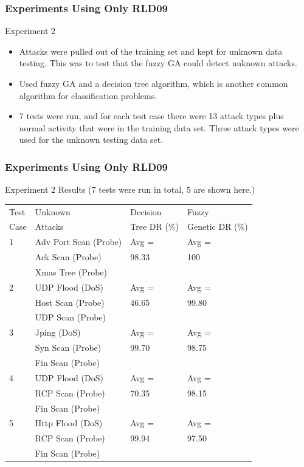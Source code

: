 \documentclass{beamer}
\begin{document}
\begin{frame}
	\frametitle{Experiments Using Only RLD09}
Experiment 2
	\begin{itemize}
		\item Attacks were pulled out of the training set and kept for unknown data testing. This was to test that the fuzzy GA could detect unknown attacks.
		\item Used fuzzy GA and a decision tree algorithm, which is another common algorithm for classification problems.
		\item 7 tests were run, and for each test case there were 13 attack types plus normal activity that were in the training data set. Three attack types were used for the unknown testing data set.
	\end{itemize}
\end{frame}


\begin{frame}
	\frametitle{Experiments Using Only RLD09}
	Experiment 2 Results (7 tests were run in total, 5 are shown here.)
	
\begin{table}
\begin{footnotesize}
\begin{tabular}{llll}
Test & Unknown & Decision & Fuzzy\\
Case & Attacks & Tree DR (\%) & Genetic DR (\%)\\ \hline

1 & Adv Port Scan (Probe) & Avg = & Avg =\\
  & Ack Scan (Probe)                 & 98.33 & 100\\
  & Xmas Tree (Probe)                 &                 &\\ \hline

2 & UDP Flood (DoS) & Avg = & Avg =\\
  & Host Scan (Probe) & 46.65 & 99.80\\
  & UDP Scan (Probe) & &\\ \hline

3 & Jping (DoS) & Avg = & Avg =\\
  & Syn Scan (Probe) & 99.70 & 98.75\\
  & Fin Scan (Probe) & &\\ \hline

4 & UDP Flood (DoS) & Avg = & Avg =\\
  & RCP Scan (Probe) & 70.35 & 98.15\\
  & Fin Scan (Probe) & &\\ \hline

5 & Http Flood (DoS) & Avg = & Avg =\\
  & RCP Scan (Probe) & 99.94 & 97.50\\
  & Fin Scan (Probe) & &\\
\hline\end{tabular}
\end{footnotesize}
\end{table}
	
\end{frame}
\end{document}
